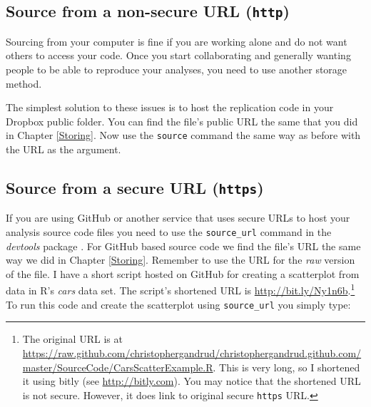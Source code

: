 \subsection{Source from a non-secure URL (\texttt{http})}

Sourcing from your computer is fine if you are working alone and do not want others to access your code. Once you start collaborating and generally wanting people to be able to reproduce your analyses, you need to
use another storage method.%

The simplest solution to these issues is to host the replication code in your Dropbox public folder. You can find the file's public URL the same that you did in Chapter \ref{Storing}. Now use the \texttt{source} command the same way as before with the URL as the argument.

\subsection{Source from a secure URL (\texttt{https})}

If you are using GitHub or another service that uses secure URLs to host your analysis source code files you need to use the \texttt{source\_url} command in the {\emph{devtools}} package \cite[]{R-devtools}. For GitHub based source code we find the file's URL the same way we did in Chapter \ref{Storing}. Remember to use the URL for the {\emph{raw}} version of the file. I have a short script hosted on GitHub for creating a scatterplot from data in R's {\emph{cars}} data set. The script's shortened URL is \url{http://bit.ly/Ny1n6b}.\footnote{The original URL is at \url{https://raw.github.com/christophergandrud/christophergandrud.github.com/master/SourceCode/CarsScatterExample.R}. This is very long, so I shortened it using bitly (see \url{http://bitly.com}). You may notice that the shortened URL is not secure. However, it does link to original secure {\tt{https}} URL.} To run this code and create the scatterplot using {\tt{source\_url}} you simply type:

